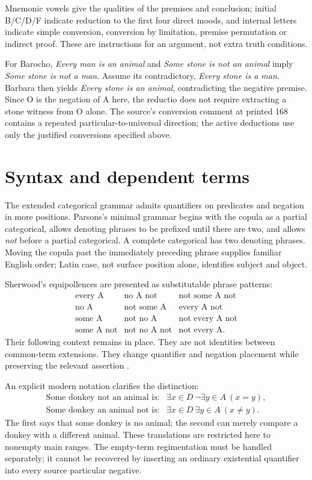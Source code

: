 Mnemonic vowels give the qualities of the premises and conclusion;
initial B/C/D/F indicate reduction to the first four direct moods,
and internal letters indicate simple conversion, conversion by
limitation, premise permutation or indirect proof. These are instructions
for an argument, not extra truth conditions.

For Barocho, \emph{Every man is an animal} and \emph{Some stone is not an
animal} imply \emph{Some stone is not a man}. Assume its contradictory,
\emph{Every stone is a man}. Barbara then yields \emph{Every stone is an
animal}, contradicting the negative premise. Since O is the negation
of A here, the reductio does not require extracting a stone witness
from O alone. The source's conversion comment at printed 168 contains
a repeated particular-to-universal direction; the active deductions
use only the justified conversions specified above.

\section{Syntax and dependent terms}
\label{sec:p13-supposition-syntax}

The extended categorical grammar admits quantifiers on predicates and
negation in more positions. Parsons's minimal grammar begins with the
copula as a partial categorical, allows denoting phrases to be prefixed
until there are two, and allows \emph{not} before a partial categorical.
A complete categorical has two denoting phrases. Moving the copula
past the immediately preceding phrase supplies familiar English order;
Latin case, not surface position alone, identifies subject and object.

Sherwood's equipollences are presented as substitutable phrase patterns:
\[
\begin{array}{ccc}
\text{every A}&\text{no A not}&\text{not some A not}\\
\text{no A}&\text{not some A}&\text{every A not}\\
\text{some A}&\text{not no A}&\text{not every A not}\\
\text{some A not}&\text{not no A not}&\text{not every A}.
\end{array}
\]
Their following context remains in place. They are not identities
between common-term extensions. They change quantifier and negation
placement while preserving the relevant assertion
\cite[pp.~168--173]{Parsons2007FordhamSupposition}.

An explicit modern notation clarifies the distinction:
\[
\begin{array}{ll}
\text{Some donkey not an animal is}:&
 \exists x\in D\ \neg\exists y\in A\ (x=y),\\
\text{Some donkey an animal not is}:&
 \exists x\in D\ \exists y\in A\ (x\ne y).
\end{array}
\]
The first says that some donkey is no animal; the second can merely
compare a donkey with a different animal. These translations are
restricted here to nonempty main ranges. The empty-term regimentation
must be handled separately; it cannot be recovered by inserting an
ordinary existential quantifier into every source particular negative.

